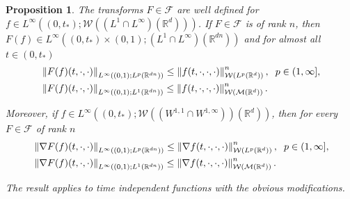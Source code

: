 \documentclass[10pt]{article}
\newtheorem{prop}{Proposition}
\newcommand{\hd}{\hspace{0.2cm}}
\newcommand*{\norm}[1]{\left\Vert{#1}\right\Vert}
\newcommand{\R}{\mathbb{R}}
\newcommand{\W}{\mathcal{W}}
\begin{document}
\begin{prop}\label{fntau}
The transforms $F \in \mathcal{F}$ are well defined for $f\in L^\infty((0,t_{*});\W((L^1\cap L^{\infty})(\R^d)))$. If $F\in \mathcal{F}$ is of rank $n$, then $F(f) \in L^{\infty}((0,t_{*})\times (0,1);(L^{1}\cap L^{\infty})(\R^{dn}))$
and for almost all $t \in (0,t_{*})$
\begin{align}\label{fnest}
 &\norm{F(f)(t,\cdot,\cdot)}_{L^{\infty}((0,1);L^{p} (\R^{dn}))} \leq \norm{f(t,\cdot,\cdot,\cdot)}^n_{\W( L^p(\R^d))}, \hd p \in (1,\infty],  \\ 
 & \label{fnestj}\norm{F(f)(t,\cdot,\cdot)}_{L^{\infty}((0,1);L^{1} (\R^{dn}))} \leq \norm{f(t,\cdot,\cdot,\cdot)}^n_{\W( \mathcal{M}(\R^d))}.
\end{align}

Moreover, if $f \in L^{\infty}((0,t_{*});\W((W^{1,1}\cap W^{1,\infty}))(\R^d))$, then for every $F \in \mathcal{F}$ of rank $n$
\begin{align}\label{fnestw}
&\norm{\nabla F(f)(t,\cdot,\cdot)}_{L^{\infty}((0,1);L^{p} (\R^{dn}))} \leq \norm{\nabla f(t,\cdot,\cdot,\cdot)}^n_{\W( L^p(\R^d))}, \hd p \in (1,\infty], \\
& \label{fnestwj} \norm{\nabla F(f)(t,\cdot,\cdot)}_{L^{\infty}((0,1);L^{1} (\R^{dn}))} \leq \norm{\nabla f(t,\cdot,\cdot,\cdot)}^n_{\W( \mathcal{M}(\R^d))}.
\end{align}

The result applies to time independent functions with the obvious modifications.
\end{prop}
\end{document}
